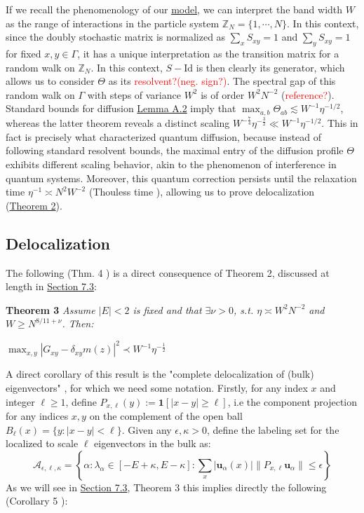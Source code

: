 \documentclass[11pt]{article}
\newenvironment{boxtheorem}[1]
  {\begin{mdframed}\noindent\textbf{#1}\itshape\space}
  {\end{mdframed}}
\newcommand{\Z}{\mathbb{Z}}
\begin{document}
If we recall the phenomenology of our \hyperref[model]{model}, we can interpret the band width $W$ as the range of interactions in the particle system $\Z_N = \{1, \cdots, N\}$. In this context, since the doubly stochastic matrix is normalized as $\sum_x S_{xy}=1$ and $\sum_y S_{xy}=1$ for fixed $x, y\in \Gamma$, it has a unique interpretation as the transition matrix for a random walk on $\Z_N$. In this context, $S-\text{Id}$ is then clearly its generator, which allows us to consider $\Theta$ as its \textcolor{red}{resolvent?(neg. sign?)}. The spectral gap of this random walk on $\Gamma$ with steps of variance $W^2$ is of order $W^2N^{-2}$ (\textcolor{red}{reference?}). Standard bounds for diffusion \hyperref[lemma-a2]{Lemma A.2} imply that $\max_{a,b}\Theta_{ab} \lesssim W^{-1}\eta^{-1/2}$, whereas the latter theorem reveals a distinct scaling  $W^{-\frac{7}{4}}\eta^{-\frac{3}{2}}\ll W^{-1}\eta^{-1/2}$. This in fact is precisely what characterized quantum diffusion, because instead of following standard resolvent bounds, the maximal entry of the diffusion profile $\Theta$ exhibits different scaling behavior, akin to the phenomenon of interference in quantum systems. Moreover, this quantum correction persists until the relaxation time $\eta^{-1}\asymp N^2W^{-2}$ (Thouless time \cite{17, 32, 33}), allowing us to prove delocalization (\hyperref[proof-deloc]{Theorem 2}).

\subsection{Delocalization}
The following (Thm. 4 \cite{bandSDE}) is a direct consequence of Theorem 2, discussed at length in \hyperref[proof-deloc]{Section 7.3}:

\begin{boxtheorem}{Theorem 3}
\noindent Assume $|E|<2$ is fixed and that $\exists \nu>0$, s.t. $\eta \asymp W^2 N^{-2}$ and $W\geq N^{8/11+\nu}$. Then:
\begin{center}$\max_{x, y}|G_{xy} - \delta_{xy}m(z)|^2\prec W^{-1}\eta^{-\frac{1}{2}}$\end{center}
\end{boxtheorem}

\noindent A direct corollary of this result is the "complete delocalization of (bulk) eigenvectors" \cite{bandSDE, 21}, for which we need some notation. Firstly, for any index $x$ and integer $\ell\geq 1$,  define $P_{x, \ell}(y):=\mathbf{1}[|x-y|\geq \ell]$, i.e the component projection for any indices $x, y$ on the complement of the open ball $B_\ell(x) = \{y:|x-y|<\ell \}$. Given any $\epsilon, \kappa>0$, define the labeling set for the localized to scale $\ell$ eigenvectors in the bulk as: $$\mathcal{A}_{\epsilon, \ell, \kappa} = \left\{\alpha: \lambda_\alpha \in [-E+\kappa, E-\kappa]: \sum_x |\mathbf{u}_\alpha(x)|\|P_{x, \ell}\mathbf{u}_\alpha\|\leq \epsilon\right\}$$
As we will see in \hyperref[proof-deloc]{Section 7.3}, Theorem 3 this implies directly the following (Corollary 5 \cite{bandSDE}): 
\end{document}
